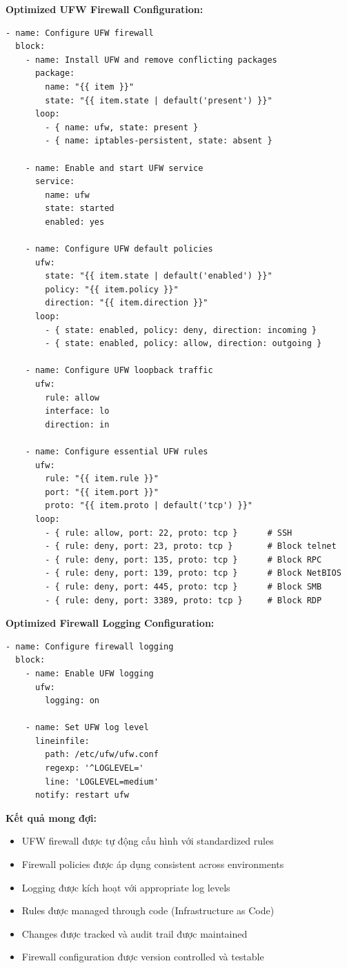 \noindent \textbf{Optimized UFW Firewall Configuration:}
\begin{verbatim}
- name: Configure UFW firewall
  block:
    - name: Install UFW and remove conflicting packages
      package:
        name: "{{ item }}"
        state: "{{ item.state | default('present') }}"
      loop:
        - { name: ufw, state: present }
        - { name: iptables-persistent, state: absent }

    - name: Enable and start UFW service
      service:
        name: ufw
        state: started
        enabled: yes

    - name: Configure UFW default policies
      ufw:
        state: "{{ item.state | default('enabled') }}"
        policy: "{{ item.policy }}"
        direction: "{{ item.direction }}"
      loop:
        - { state: enabled, policy: deny, direction: incoming }
        - { state: enabled, policy: allow, direction: outgoing }

    - name: Configure UFW loopback traffic
      ufw:
        rule: allow
        interface: lo
        direction: in

    - name: Configure essential UFW rules
      ufw:
        rule: "{{ item.rule }}"
        port: "{{ item.port }}"
        proto: "{{ item.proto | default('tcp') }}"
      loop:
        - { rule: allow, port: 22, proto: tcp }      # SSH
        - { rule: deny, port: 23, proto: tcp }       # Block telnet
        - { rule: deny, port: 135, proto: tcp }      # Block RPC
        - { rule: deny, port: 139, proto: tcp }      # Block NetBIOS
        - { rule: deny, port: 445, proto: tcp }      # Block SMB
        - { rule: deny, port: 3389, proto: tcp }     # Block RDP
\end{verbatim}

\noindent \textbf{Optimized Firewall Logging Configuration:}
\begin{verbatim}
- name: Configure firewall logging
  block:
    - name: Enable UFW logging
      ufw:
        logging: on

    - name: Set UFW log level
      lineinfile:
        path: /etc/ufw/ufw.conf
        regexp: '^LOGLEVEL='
        line: 'LOGLEVEL=medium'
      notify: restart ufw
\end{verbatim}

\noindent \textbf{Kết quả mong đợi:}
\begin{itemize}
\item UFW firewall được tự động cấu hình với standardized rules
\item Firewall policies được áp dụng consistent across environments
\item Logging được kích hoạt với appropriate log levels
\item Rules được managed through code (Infrastructure as Code)
\item Changes được tracked và audit trail được maintained
\item Firewall configuration được version controlled và testable
\end{itemize}

